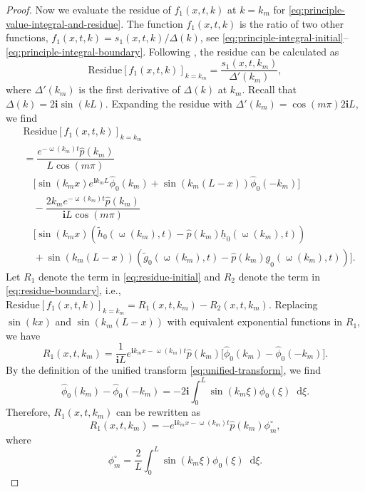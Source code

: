 \documentclass[journal,twoside,web]{ieeecolor}
\newcommand{\state}{\phi}
\newcommand{\statehat}{\hat{\state}}
\newcommand{\im}{\mathbf{i}}
\newcommand*\diff{\mathop{}\!\mathrm{d}}
\newcommand{\wcomplex}{\upomega}
\begin{document}
\begin{proof}
Now we evaluate the residue of $f_1(x,t,k)$ at $k=k_m$ for \eqref{eq:principle-value-integral-and-residue}.
The function $f_1(x,t,k)$ is the ratio of two other functions, $f_1(x,t,k) = s_1(x,t,k)/\Delta(k)$, see \eqref{eq:principle-integral-initial}--\eqref{eq:principle-integral-boundary}. 
Following , the residue can be calculated as 
\begin{equation*}
	\text{Residue}[f_1(x,t,k)]_{k=k_m} = \dfrac{s_1(x,t,k_m)}{\Delta'(k_m)},
\end{equation*}
where $\Delta'(k_m)$ is the first derivative of $\Delta(k)$ at $k_m$.
Recall that $\Delta(k) = 2\im\sin(kL)$.
Expanding the residue with $\Delta'(k_m) = \cos(m\pi)2\im L$, we find
\begin{align}
		&\text{Residue}[f_1(x,t,k)]_{k=k_m} \nonumber\\
		&=\dfrac{e^{-\wcomplex(k_m)t}\hat{p}(k_m)}{L\cos(m\pi)} \nonumber \\ & \quad\big[\sin(k_mx)e^{\im k_m L}\statehat_0(k_m) + \sin(k_m(L-x))\statehat_0(-k_m)\big] \label{eq:residue-initial} \\
		&\quad - \dfrac{2k_me^{-\wcomplex(k_m)t}\hat{p}(k_m)}{\im L\cos(m\pi)} \nonumber \\ & \quad\big[\sin(k_mx)(\tilde{h}_0(\wcomplex(k_m),t)  - \hat{p}(k_m)\underline{h}_0(\wcomplex(k_m),t)) \nonumber \\
		&\quad + \sin(k_m(L-x))(\tilde{g}_0(\wcomplex(k_m),t) - \hat{p}(k_m)\underline{g}_0(\wcomplex(k_m),t))\big]. \label{eq:residue-boundary}
\end{align}
Let $R_1$ denote the term in \eqref{eq:residue-initial} and $R_2$ denote the term in \eqref{eq:residue-boundary}, i.e., $\text{Residue}[f_1(x,t,k)]_{k=k_m} = R_1(x,t,k_m) - R_2(x,t,k_m)$.
Replacing $\sin(kx)$ and $\sin(k_m(L-x))$ with equivalent exponential functions in $R_1$, we have
\begin{equation*}
	R_1(x,t,k_m) = \dfrac{1}{\im L} e^{\im k_m x-\wcomplex(k_m)t}\hat{p}(k_m)\big[\statehat_0(k_m) - \statehat_0(-k_m)\big].
\end{equation*}
By the definition of the unified transform \eqref{eq:unified-transform}, we find
\begin{equation*}
	\statehat_0(k_m) - \statehat_0(-k_m) = -2\im\int_{0}^{L}\sin(k_m\xi)\state_0(\xi)\diff \xi.
\end{equation*}
Therefore, $R_1(x,t,k_m)$ can be rewritten as
$$	R_1(x,t,k_m) = -e^{\im k_m x-\wcomplex(k_m)t}\hat{p}(k_m) \state_m^\circ, $$
where
$$
	\state_{m}^\circ = \frac{2}{L}\int_{0}^{L}\sin(k_m\xi)\state_0(\xi)\diff \xi.
$$
\end{proof}
\end{document}
